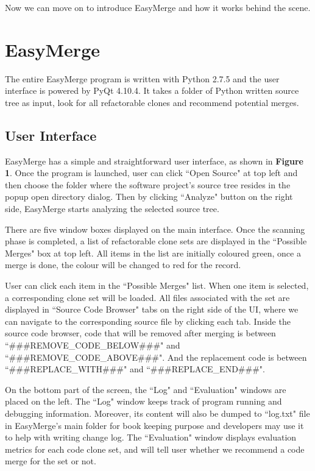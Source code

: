\documentclass{acm_proc_article-sp}
\begin{document}
Now we can move on to introduce EasyMerge and how it works behind the scene.


\section{EasyMerge}
The entire EasyMerge program is written with Python 2.7.5 and the user interface is powered by PyQt 4.10.4.
It takes a folder of Python written source tree as input, look for all refactorable clones and recommend potential merges.  

\subsection{User Interface}
EasyMerge has a simple and straightforward user interface, as shown in {\bf Figure 1}.
Once the program is launched, user can click ``Open Source" at top left and then choose the folder 
where the software project's source tree resides in the popup open directory dialog.
Then by clicking ``Analyze" button on the right side, EasyMerge starts analyzing the selected source tree.

There are five window boxes displayed on the main interface.
Once the scanning phase is completed, a list of refactorable clone sets are displayed in the ``Possible Merges" box at top left.
All items in the list are initially coloured green, once a merge is done, the colour will be changed to red for the record.

User can click each item in the ``Possible Merges" list. When one item is selected, a corresponding clone set will be loaded. All files
associated with the set are displayed in ``Source Code Browser" tabs on the right side of the UI, where we can navigate to the
corresponding source file by clicking each tab.
Inside the source code browser, code that will be removed after merging is between ``\#\#\#REMOVE\_CODE\_BELOW\#\#\#"
and ``\#\#\#REMOVE\_CODE\_ABOVE\#\#\#". And the replacement code is between ``\#\#\#REPLACE\_WITH\#\#\#"
and ``\#\#\#REPLACE\_END\#\#\#".

On the bottom part of the screen, the ``Log" and ``Evaluation" windows are placed on the left. The ``Log" window keeps track of
program running and debugging information. Moreover, its content will also be dumped to ``log.txt" file in EasyMerge's main folder for
book keeping purpose and developers may use it to help with writing change log. The ``Evaluation" window displays evaluation metrics
for each code clone set, and will tell user whether we recommend a code merge for the set or not.
\end{document}
